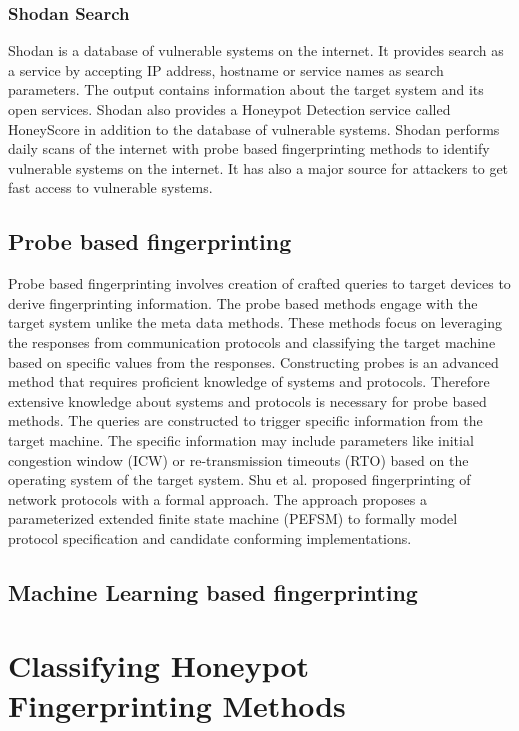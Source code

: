 \documentclass[letterpaper, 10 pt, conference]{ieeeconf}  %
\begin{document}
\subsubsection{Shodan Search}
Shodan is a database of vulnerable systems on the internet. It provides search as a service by accepting IP address, hostname or service names as search parameters. The output contains information about the target system and its open services. Shodan also provides a Honeypot Detection service called HoneyScore \cite{SHODAN} in addition to the database of vulnerable systems. Shodan performs daily scans of the internet with probe based fingerprinting methods to identify vulnerable systems on the internet. It has also a major source for attackers to get fast access to vulnerable systems. 

\subsection{Probe based fingerprinting}
Probe based fingerprinting involves creation of crafted queries to target devices to derive fingerprinting information. The probe based methods engage with  the target system unlike the meta data methods. These methods focus on leveraging the responses from communication protocols and classifying the target machine based on specific values from the responses. Constructing probes is an advanced method that requires proficient knowledge of systems and protocols. Therefore extensive knowledge about systems and protocols is necessary for probe based methods. The queries are constructed to trigger specific information from the target machine. The specific information may include parameters like initial congestion window (ICW) or re-transmission timeouts (RTO) based on the operating system of the target system. 
Shu et al.\cite{shu2006network} proposed fingerprinting of network protocols with a formal approach. The approach proposes a parameterized extended finite state machine (PEFSM) to formally model protocol specification and candidate conforming implementations. 



\subsection{Machine Learning based fingerprinting}







 \section{Classifying Honeypot Fingerprinting Methods}
   
\end{document}
